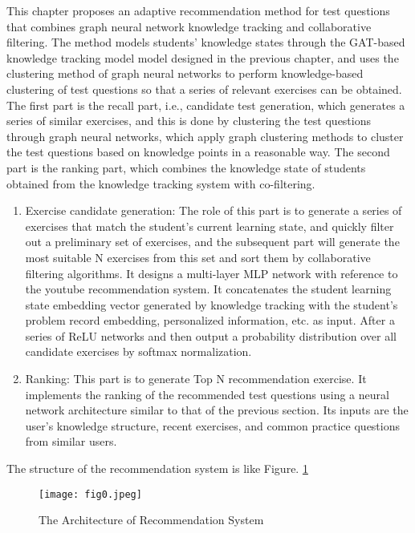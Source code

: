 This chapter proposes an adaptive recommendation method for test questions that combines graph neural network knowledge tracking and collaborative filtering. The method models students' knowledge states through the GAT-based knowledge tracking model model designed in the previous chapter, and uses the clustering method of graph neural networks to perform knowledge-based clustering of test questions so that a series of relevant exercises can be obtained. The first part is the recall part, i.e., candidate test generation, which generates a series of similar exercises, and this is done by clustering the test questions through graph neural networks, which apply graph clustering methods to cluster the test questions based on knowledge points in a reasonable way. The second part is the ranking part, which combines the knowledge state of students obtained from the knowledge tracking system with co-filtering. 
\begin{enumerate}
  \item Exercise candidate generation: The role of this part is to generate a series of exercises that match the student's current learning state, and quickly filter out a preliminary set of exercises, and the subsequent part will generate the most suitable N exercises from this set and sort them by collaborative filtering algorithms. It designs a multi-layer MLP network with reference to the youtube recommendation system. It concatenates the student learning state embedding vector generated by knowledge tracking with the student's problem record embedding, personalized information, etc. as input. After a series of ReLU networks and then output a probability distribution over all candidate exercises by softmax normalization.
  \item Ranking: This part is to generate Top N recommendation exercise. It implements the ranking of the recommended test questions using a neural network architecture similar to that of the previous section. Its inputs are the user's knowledge structure, recent exercises, and common practice questions from similar users.
\end{enumerate}

The structure of the recommendation system is like Figure. \ref{fig0}

\begin{figure}[h]
	\centering
	\texttt{[image: fig0.jpeg]}
	\caption{The Architecture of Recommendation System}
	\label{fig0}
\end{figure}



